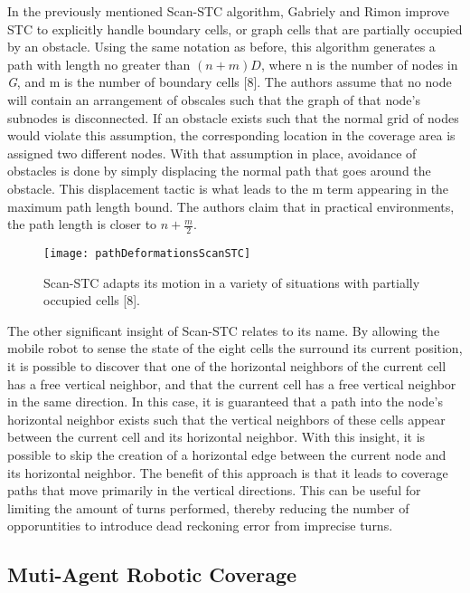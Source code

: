 In the previously mentioned Scan-STC algorithm, Gabriely and Rimon improve STC to explicitly handle boundary cells, or graph cells that are partially occupied by an obstacle. Using the same notation as before, this algorithm generates a path with length no greater than $ (n + m)\textit{D} $, where n is the number of nodes in \textit{G}, and m is the number of boundary cells [8]. The authors assume that no node will contain an arrangement of obscales such that the graph of that node's subnodes is disconnected. If an obstacle exists such that the normal grid of nodes would violate this assumption, the corresponding location in the coverage area is assigned two different nodes. With that assumption in place, avoidance of obstacles is done by simply displacing the normal path that goes around the obstacle. This displacement tactic is what leads to the m term appearing in the maximum path length bound. The authors claim that in practical environments, the path length is closer to $ n + \frac{m}{2} $. 

\begin{figure}[H]
\texttt{[image: pathDeformationsScanSTC]}
\caption[Path Deformations in Scan-STC]{Scan-STC adapts its motion in a variety of situations with partially occupied cells [8].}
\end{figure}


The other significant insight of Scan-STC relates to its name. By allowing the mobile robot to sense the state of the eight cells the surround its current position, it is possible to discover that one of the horizontal neighbors of the current cell has a free vertical neighbor, and that the current cell has a free vertical neighbor in the same direction. In this case, it is guaranteed that a path into the node's horizontal neighbor exists such that the vertical neighbors of these cells appear between the current cell and its horizontal neighbor. With this insight, it is possible to skip the creation of a horizontal edge between the current node and its horizontal neighbor. The benefit of this approach is that it leads to coverage paths that move primarily in the vertical directions. This can be useful for limiting the amount of turns performed, thereby reducing the number of opporuntities to introduce dead reckoning error from imprecise turns.

\subsection{Muti-Agent Robotic Coverage}

